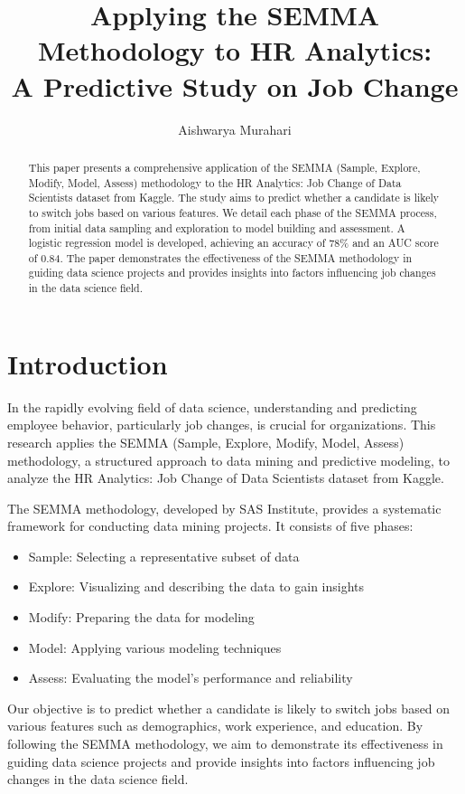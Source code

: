 \documentclass[12pt]{article}
\title{Applying the SEMMA Methodology to HR Analytics: \\A Predictive Study on Job Change}
\author{Aishwarya Murahari}
\date{}
\begin{document}
\maketitle

\begin{abstract}
This paper presents a comprehensive application of the SEMMA (Sample, Explore, Modify, Model, Assess) methodology to the HR Analytics: Job Change of Data Scientists dataset from Kaggle. The study aims to predict whether a candidate is likely to switch jobs based on various features. We detail each phase of the SEMMA process, from initial data sampling and exploration to model building and assessment. A logistic regression model is developed, achieving an accuracy of 78\% and an AUC score of 0.84. The paper demonstrates the effectiveness of the SEMMA methodology in guiding data science projects and provides insights into factors influencing job changes in the data science field.
\end{abstract}

\section{Introduction}
In the rapidly evolving field of data science, understanding and predicting employee behavior, particularly job changes, is crucial for organizations. This research applies the SEMMA (Sample, Explore, Modify, Model, Assess) methodology, a structured approach to data mining and predictive modeling, to analyze the HR Analytics: Job Change of Data Scientists dataset from Kaggle.

The SEMMA methodology, developed by SAS Institute, provides a systematic framework for conducting data mining projects. It consists of five phases:
\begin{itemize}
    \item Sample: Selecting a representative subset of data
    \item Explore: Visualizing and describing the data to gain insights
    \item Modify: Preparing the data for modeling
    \item Model: Applying various modeling techniques
    \item Assess: Evaluating the model's performance and reliability
\end{itemize}

Our objective is to predict whether a candidate is likely to switch jobs based on various features such as demographics, work experience, and education. By following the SEMMA methodology, we aim to demonstrate its effectiveness in guiding data science projects and provide insights into factors influencing job changes in the data science field.
\end{document}
